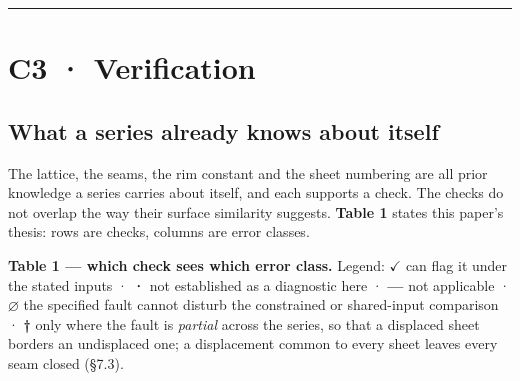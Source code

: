 \documentclass[11pt,a4paper]{article}
\begin{document}
\bigskip\hrule\bigskip

\section{C3 · Verification}

\subsection{What a series already knows about itself}

The lattice, the seams, the rim constant and the sheet numbering are all prior knowledge a series carries about itself, and each supports a check. The checks do not overlap the way their surface similarity suggests. \textbf{Table 1} states this paper's thesis: rows are checks, columns are error classes.

\textbf{Table 1 — which check sees which error class.} Legend: \textbf{\ensuremath{\checkmark}} can flag it under the stated inputs · \textbf{·} not established as a diagnostic here · \textbf{—} not applicable · \textbf{\ensuremath{\varnothing}} the specified fault cannot disturb the constrained or shared-input comparison · \textbf{†} only where the fault is \emph{partial} across the series, so that a displaced sheet borders an undisplaced one; a displacement common to every sheet leaves every seam closed (§7.3).
\end{document}
